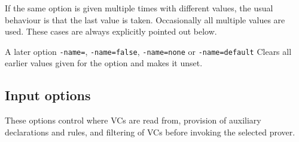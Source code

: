 \documentclass[12pt,fleqn]{article}
\begin{document}
If the same option is given multiple times with different values, the
usual behaviour is that the last value is taken.  Occasionally all multiple 
values are used.  These cases are always explicitly pointed out below.

A later option 
\texttt{-name=},
\texttt{-name=false},
\texttt{-name=none} or 
\texttt{-name=default}
Clears all earlier values given for the option and makes it unset.

\subsection{Input options}

These options control where VCs are read from, provision of auxiliary
declarations and rules, and filtering of VCs before invoking the selected
prover.
\end{document}
